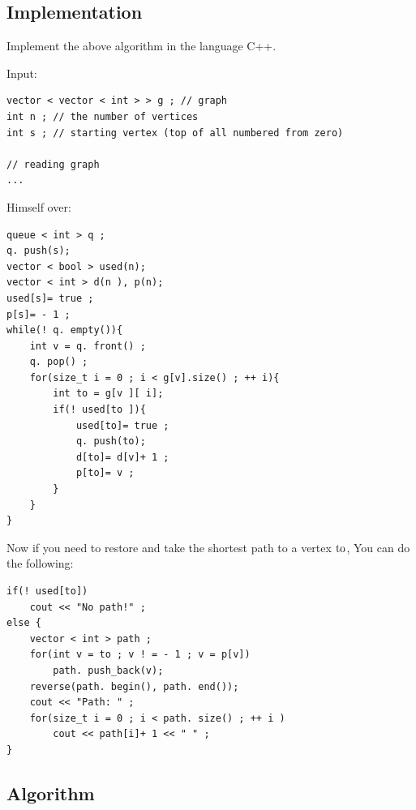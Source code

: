 \subsection{ Implementation }

Implement the above algorithm in the language C++.

Input:

\begin{verbatim}
vector < vector < int > > g ; // graph
int n ; // the number of vertices
int s ; // starting vertex (top of all numbered from zero)
 
// reading graph
...
\end{verbatim}
Himself over:

\begin{verbatim}
queue < int > q ;
q. push(s);
vector < bool > used(n);
vector < int > d(n ), p(n);
used[s]= true ;
p[s]= - 1 ;
while(! q. empty()){
    int v = q. front() ;
    q. pop() ;
    for(size_t i = 0 ; i < g[v].size() ; ++ i){
        int to = g[v ][ i];
        if(! used[to ]){
            used[to]= true ;
            q. push(to);
            d[to]= d[v]+ 1 ;
            p[to]= v ;
        }
    }
} 
\end{verbatim}
Now if you need to restore and take the shortest path to a vertex $\rm to$, You can do the following:

\begin{verbatim}
if(! used[to])
    cout << "No path!" ;
else {
    vector < int > path ;
    for(int v = to ; v ! = - 1 ; v = p[v])
        path. push_back(v);
    reverse(path. begin(), path. end());
    cout << "Path: " ;
    for(size_t i = 0 ; i < path. size() ; ++ i )
        cout << path[i]+ 1 << " " ;
} 
\end{verbatim}
\subsection{ Algorithm }


